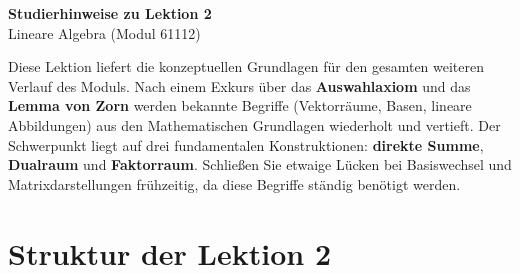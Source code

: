 \documentclass[a4paper,12pt]{article}
\begin{document}
\begin{center}
  {\LARGE\bfseries Studierhinweise zu Lektion 2}\\[0.5em]
  {\large Lineare Algebra (Modul 61112)}
\end{center}

\vspace{0.8em}

Diese Lektion liefert die konzeptuellen Grundlagen für den gesamten weiteren Verlauf des Moduls.
Nach einem Exkurs über das \textbf{Auswahlaxiom} und das \textbf{Lemma von Zorn} werden
bekannte Begriffe (Vektorräume, Basen, lineare Abbildungen) aus den Mathematischen Grundlagen
wiederholt und vertieft. Der Schwerpunkt liegt auf drei fundamentalen Konstruktionen:
\textbf{direkte Summe}, \textbf{Dualraum} und \textbf{Faktorraum}. Schließen Sie etwaige
Lücken bei Basiswechsel und Matrixdarstellungen frühzeitig, da diese Begriffe ständig benötigt werden.

\section*{Struktur der Lektion 2}

\begin{center}
\end{center}

\newpage

\end{document}
